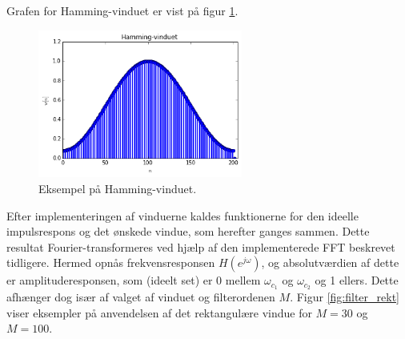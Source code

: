 Grafen for Hamming-vinduet er vist på figur \ref{fig:Hamming}.
\begin{figure}[H]
    \centering
    \includegraphics[width = 0.6\textwidth]{figures/Hamming-vindue.PNG}
    \caption{Eksempel på Hamming-vinduet.}
    \label{fig:Hamming}
\end{figure}

Efter implementeringen af vinduerne kaldes funktionerne for den ideelle impulsrespons og det ønskede vindue, som herefter ganges sammen. Dette resultat Fourier-transformeres ved hjælp af den implementerede FFT beskrevet tidligere. Hermed opnås frekvensresponsen $H(e^{j\omega})$, og absolutværdien af dette er amplituderesponsen, som (ideelt set) er 0 mellem $\omega_{c_1}$ og $\omega_{c_2}$ og 1 ellers. Dette afhænger dog især af valget af vinduet og filterordenen $M$. Figur \ref{fig:filter_rekt} viser eksempler på anvendelsen af det rektangulære vindue for $M = 30$ og $M = 100$.

